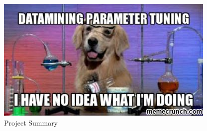 \documentclass[a4paper, 11pt]{article}
\begin{document}
\begin{figure}[H]
\centering
\includegraphics[scale=0.7]{meme.jpg}
\caption{Project Summary}
\label{fig:Summary}
\end{figure}





\end{document}
